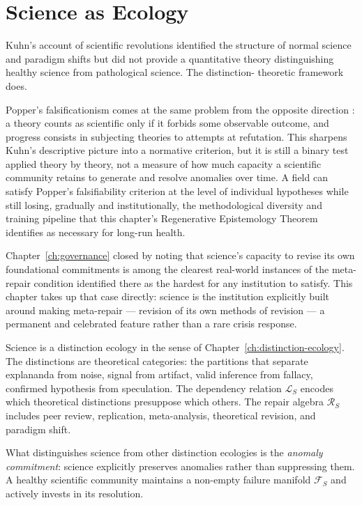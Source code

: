 \documentclass[12pt,twoside,openright]{book}
\begin{document}
\section{Science as Ecology}

Kuhn's account of scientific revolutions
\parencite{kuhn1962structure} identified the structure
of normal science and paradigm shifts but did not
provide a quantitative theory distinguishing healthy
science from pathological science. The distinction-
theoretic framework does.

Popper's falsificationism comes at the same problem from
the opposite direction \parencite{popper1959}: a theory
counts as scientific only if it forbids some observable
outcome, and progress consists in subjecting theories to
attempts at refutation. This sharpens Kuhn's descriptive
picture into a normative criterion, but it is still a
binary test applied theory by theory, not a measure of
how much capacity a scientific community retains to
generate and resolve anomalies over time. A field can
satisfy Popper's falsifiability criterion at the level of
individual hypotheses while still losing, gradually and
institutionally, the methodological diversity and training
pipeline that this chapter's Regenerative Epistemology
Theorem identifies as necessary for long-run health.

Chapter~\ref{ch:governance} closed by noting that science's
capacity to revise its own foundational commitments is among
the clearest real-world instances of the meta-repair
condition identified there as the hardest for any institution
to satisfy. This chapter takes up that case directly: science
is the institution explicitly built around making meta-repair
--- revision of its own methods of revision --- a permanent
and celebrated feature rather than a rare crisis response.

Science is a distinction ecology in the sense of
Chapter~\ref{ch:distinction-ecology}. The distinctions
are theoretical categories: the partitions that
separate explananda from noise, signal from artifact,
valid inference from fallacy, confirmed hypothesis
from speculation. The dependency relation
$\mathcal{L}_S$ encodes which theoretical distinctions
presuppose which others. The repair algebra
$\mathcal{R}_S$ includes peer review, replication,
meta-analysis, theoretical revision, and paradigm shift.

What distinguishes science from other distinction
ecologies is the \emph{anomaly commitment}: science
explicitly preserves anomalies rather than suppressing
them. A healthy scientific community maintains a
non-empty failure manifold $\mathcal{F}_S$ and
actively invests in its resolution.
\end{document}
